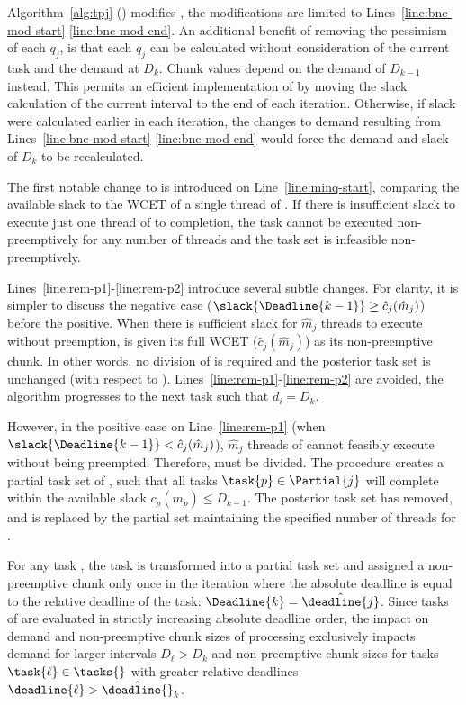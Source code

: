 Algorithm~\ref{alg:tpj} (\tpj{}) modifies \bng{}, the modifications
are limited to
Lines~\ref{line:bnc-mod-start}-\ref{line:bnc-mod-end}. An additional
benefit of \bng{} removing the pessimism of each ${q_j}$, is
that each ${q_j}$ can be calculated without consideration of the
current task  and the demand at ${D_k}$. Chunk values depend
on the demand of ${D_{k-1}}$ instead. This permits an
efficient implementation of \tpj{} by moving the slack calculation of
the current interval to the end of each iteration. Otherwise, if slack
were calculated earlier in each iteration, the changes to demand
resulting from Lines~\ref{line:bnc-mod-start}-\ref{line:bnc-mod-end}
would force the demand and slack of ${D_k}$ to be recalculated.

The first notable change to \bng{} is introduced on
Line~\ref{line:minq-start}, comparing the available slack to the WCET
of a single thread of . If there is insufficient slack to
execute just one thread of  to completion, the task cannot be
executed non-preemptively for any number of threads and the task set
is infeasible non-preemptively.

Lines~\ref{line:rem-p1}-\ref{line:rem-p2} introduce several
subtle changes. For clarity, it is simpler to discuss
the negative case (${\slack{\Deadline{k-1}} \ge \hat{c}_j(\hat{m}_j)}$)
before the positive.
When there is sufficient slack for ${\hat{m}_j}$ threads to execute
without preemption,  is given its full WCET
(${\hat{c}_j(\hat{m}_j)}$) as its non-preemptive chunk. In other
words, no division of  is required and the posterior task set
\tasks{} is unchanged (with respect to ).
Lines~\ref{line:rem-p1}-\ref{line:rem-p2} are avoided, the
algorithm progresses to the next task such that ${d_i = D_k}$.

However, in the positive case on Line~\ref{line:rem-p1} (when
${\slack{\Deadline{k-1}} < \hat{c}_j(\hat{m}_j)}$), ${\hat{m}_j}$
threads of  cannot feasibly execute without being
preempted. Therefore,  must be divided. The \texdivide{}
procedure creates a partial task  set of , such that
all tasks ${\task{p} \in \Partial{j}}$ will complete within the
available slack ${c_p(m_p) \le D_{k-1}}$. The posterior task set \tasks{}
has  removed, and is replaced by the partial set 
maintaining the specified number of threads for .

For any task , the task is transformed into a partial task set
 and assigned a non-preemptive chunk only
once in the iteration where the absolute deadline  is
equal to the relative deadline of the task:
${\Deadline{k} = \hat{\deadline{j}}}$. Since tasks of \tasks{} are
evaluated in strictly increasing absolute deadline order, the impact
on demand and non-preemptive chunk sizes of processing 
exclusively impacts demand for larger intervals ${D_\ell > D_k}$ and
non-preemptive chunk sizes for tasks ${\task{\ell} \in \tasks{}}$ with
greater relative deadlines ${\deadline{\ell} > \hat{\deadline{}}_k}$.

